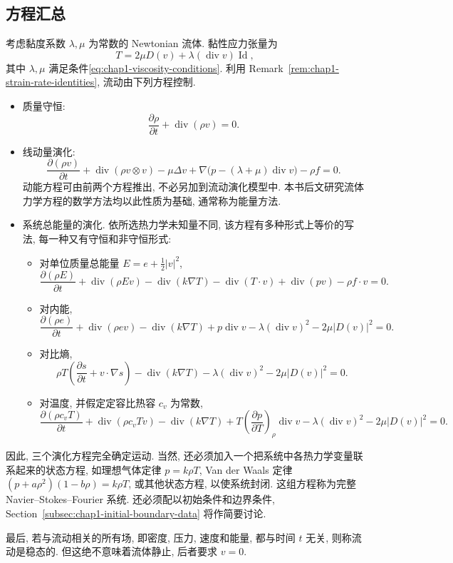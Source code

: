 \subsection{方程汇总}
\label{sec:chap1-equation-summary}

考虑黏度系数 $\lambda,\mu$ 为常数的 Newtonian 流体. 黏性应力张量为
\[
  T=2\mu D(v)+\lambda(\operatorname{div}v)\operatorname{Id},
\]
其中 $\lambda,\mu$ 满足条件\eqref{eq:chap1-viscosity-conditions}. 利用 Remark~\ref{rem:chap1-strain-rate-identities}, 流动由下列方程控制.

\begin{itemize}
\item 质量守恒:
\[
  \frac{\partial\rho}{\partial t}+\operatorname{div}(\rho v)=0.
\]
\item 线动量演化:
\[
\frac{\partial(\rho v)}{\partial t}+\operatorname{div}(\rho v\otimes v)-\mu\Delta v
+\nabla\bigl(p-(\lambda+\mu)\operatorname{div}v\bigr)-\rho f=0.
\]
动能方程可由前两个方程推出, 不必另加到流动演化模型中. 本书后文研究流体力学方程的数学方法均以此性质为基础, 通常称为能量方法.
\item 系统总能量的演化. 依所选热力学未知量不同, 该方程有多种形式上等价的写法, 每一种又有守恒和非守恒形式:
\begin{itemize}
\item 对单位质量总能量 $E=e+\tfrac12|v|^2$,
\[
\frac{\partial(\rho E)}{\partial t}+\operatorname{div}(\rho Ev)-\operatorname{div}(k\nabla T)
-\operatorname{div}(T\cdot v)+\operatorname{div}(pv)-\rho f\cdot v=0.
\]
\item 对内能,
\[
\frac{\partial(\rho e)}{\partial t}+\operatorname{div}(\rho ev)-\operatorname{div}(k\nabla T)
+p\operatorname{div}v-\lambda(\operatorname{div}v)^2-2\mu|D(v)|^2=0.
\]
\item 对比熵,
\[
\rho T\left(\frac{\partial s}{\partial t}+v\cdot\nabla s\right)-\operatorname{div}(k\nabla T)
-\lambda(\operatorname{div}v)^2-2\mu|D(v)|^2=0.
\]
\item 对温度, 并假定定容比热容 $c_v$ 为常数,
\[
\frac{\partial(\rho c_vT)}{\partial t}+\operatorname{div}(\rho c_vTv)-\operatorname{div}(k\nabla T)
+T\left(\frac{\partial p}{\partial T}\right)_\rho\operatorname{div}v
-\lambda(\operatorname{div}v)^2-2\mu|D(v)|^2=0.
\]
\end{itemize}
\end{itemize}

因此, 三个演化方程完全确定运动. 当然, 还必须加入一个把系统中各热力学变量联系起来的状态方程, 如理想气体定律 $p=k\rho T$, Van der Waals 定律 $(p+a\rho^2)(1-b\rho)=k\rho T$, 或其他状态方程, 以使系统封闭. 这组方程称为完整 Navier--Stokes--Fourier 系统. 还必须配以初始条件和边界条件, Section~\ref{subsec:chap1-initial-boundary-data} 将作简要讨论.

最后, 若与流动相关的所有场, 即密度, 压力, 速度和能量, 都与时间 $t$ 无关, 则称流动是稳态的. 但这绝不意味着流体静止, 后者要求 $v=0$.
